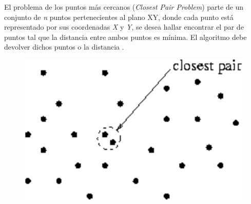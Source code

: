 El problema de los puntos más cercanos ({\em Closest Pair Problem}) parte de un conjunto de {\em n} puntos pertenecientes al plano XY, donde cada punto está representado por sus coordenadas {\em X} y {\em Y}, se desea hallar encontrar el par de puntos tal que la distancia entre ambos puntos es mínima. El algoritmo debe devolver dichos puntos o la distancia .

\begin{figure}[h]
	\centering 
	\includegraphics[scale=0.3]{img/closest_pair}
	\label{contexto:figura1}
\end{figure}